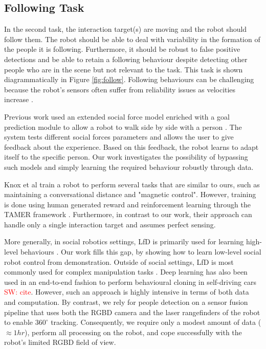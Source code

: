 \documentclass[letterpaper, 10 pt, conference]{ieeeconf}
\newcommand{\sw}[1]{\textcolor{red}{SW: #1}}
\begin{document}
\begin{figure}[tbh]
    \vspace{-2mm}

  \label{fig:behaviors}
  \end{figure}

\subsection{Following Task} 

In the second task, the interaction target(s) are moving and the robot should follow them. The robot should be able to deal with variability in the formation of the people it is following. Furthermore, it should be robust to false positive detections and be able to retain a following behaviour despite detecting other people who are in the scene but not relevant to the task. This task is shown diagrammatically in Figure \ref{fig:follow}. Following behaviours can be challenging because the robot's sensors often suffer from reliability issues as velocities increase \cite{kobilarov2006people}.

Previous work used an extended social force model enriched with a goal prediction module to allow a robot to walk side by side with a person \cite{ferrer2016robot}. The system tests different social forces parameters and allows the user to give feedback about the experience. Based on this feedback, the robot learns to adapt itself to the specific person.  Our work investigates the possibility of bypassing such models and simply learning the required behaviour robustly through data.  

Knox et al \cite{knox2013training} train a robot to perform several tasks that are similar to ours, such as maintaining a conversational distance and "magnetic control". However, training is done using human generated reward and reinforcement learning through the TAMER framework \cite{knox2009interactively}. Furthermore, in contrast to our work, their approach can handle only a single interaction target and assumes perfect sensing.

More generally, in social robotics settings, LfD is primarily used for learning high-level behaviours \cite{louie2016learning} \cite{lockerd2004tutelage}. Our work fills this gap, by showing how to learn low-level social robot control from demonstration. Outside of social settings, LfD is most commonly used for complex manipulation tasks \cite{argall2009survey}. Deep learning has also been used in an end-to-end fashion to perform behavioural cloning in self-driving cars \sw{cite}. However, such an approach is highly intensive in terms of both data and computation.  By contrast, we rely for people detection on a sensor fusion pipeline that uses both the RGBD camera and the laser rangefinders of the robot to enable $360^\circ$ tracking.  Consequently, we require only a modest amount of data ($\approx 1hr$), perform all processing on the robot, and cope successfully with the robot's limited RGBD field of view.
\end{document}
